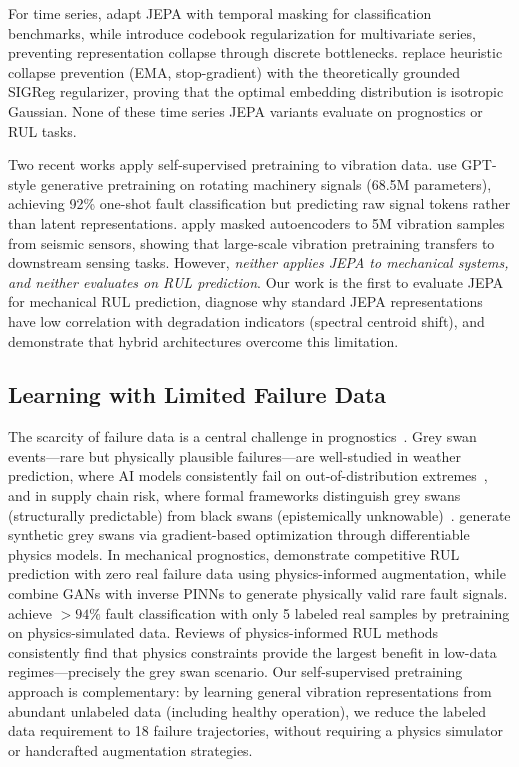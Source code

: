 For time series, \citet{tsjepa2024} adapt JEPA with temporal masking for classification benchmarks, while \citet{mtsjepa2026} introduce codebook regularization for multivariate series, preventing representation collapse through discrete bottlenecks. \citet{balestriero2025lejepa} replace heuristic collapse prevention (EMA, stop-gradient) with the theoretically grounded SIGReg regularizer, proving that the optimal embedding distribution is isotropic Gaussian. None of these time series JEPA variants evaluate on prognostics or RUL tasks.

Two recent works apply self-supervised pretraining to vibration data. \citet{wang2025rmgpt} use GPT-style generative pretraining on rotating machinery signals (68.5M parameters), achieving 92\% one-shot fault classification but predicting raw signal tokens rather than latent representations. \citet{openMAE2025} apply masked autoencoders to 5M vibration samples from seismic sensors, showing that large-scale vibration pretraining transfers to downstream sensing tasks. However, \emph{neither applies JEPA to mechanical systems, and neither evaluates on RUL prediction}. Our work is the first to evaluate JEPA for mechanical RUL prediction, diagnose why standard JEPA representations have low correlation with degradation indicators (spectral centroid shift), and demonstrate that hybrid architectures overcome this limitation.

\subsection{Learning with Limited Failure Data}
\label{sec:related_rare}

The scarcity of failure data is a central challenge in prognostics~\citep{weak_supervision_phm2025}. Grey swan events---rare but physically plausible failures---are well-studied in weather prediction, where AI models consistently fail on out-of-distribution extremes~\citep{greyswan_weather2024}, and in supply chain risk, where formal frameworks distinguish grey swans (structurally predictable) from black swans (epistemically unknowable)~\citep{greyswan_supplychain2025}. \citet{greyswan_factory2026} generate synthetic grey swans via gradient-based optimization through differentiable physics models. In mechanical prognostics, \citet{physics_augment_rul2024} demonstrate competitive RUL prediction with zero real failure data using physics-informed augmentation, while \citet{deng2025gan_pinn} combine GANs with inverse PINNs to generate physically valid rare fault signals. \citet{digitaltwin_bearing2025} achieve $>94\%$ fault classification with only 5 labeled real samples by pretraining on physics-simulated data. Reviews of physics-informed RUL methods~\citep{physics_rul_review2024} consistently find that physics constraints provide the largest benefit in low-data regimes---precisely the grey swan scenario. Our self-supervised pretraining approach is complementary: by learning general vibration representations from abundant unlabeled data (including healthy operation), we reduce the labeled data requirement to 18 failure trajectories, without requiring a physics simulator or handcrafted augmentation strategies.
